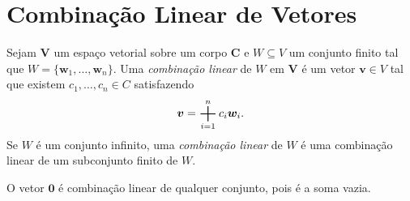 \section{Combinação Linear de Vetores}

\begin{defi}
	Sejam $\bm V$ um espaço vetorial sobre um corpo $\bm C$ e $W \subseteq V$ um conjunto finito tal que $W=\{\bm w_1,\ldots,\bm w_n\}$. Uma \emph{combinação linear} de $W$ em $\bm V$ é um vetor $\bm v \in V$ tal que existem $c_1,\ldots,c_n \in C$ satisfazendo
	\begin{equation*}
	\bm v = \bigsum_{i=1}^n c_i\bm w_i.
	\end{equation*}
Se $W$ é um conjunto infinito, uma \emph{combinação linear} de $W$ é uma combinação linear de um subconjunto finito de $W$.


\end{defi}

 O vetor $\bm 0$ é combinação linear de qualquer conjunto, pois é a soma vazia.

